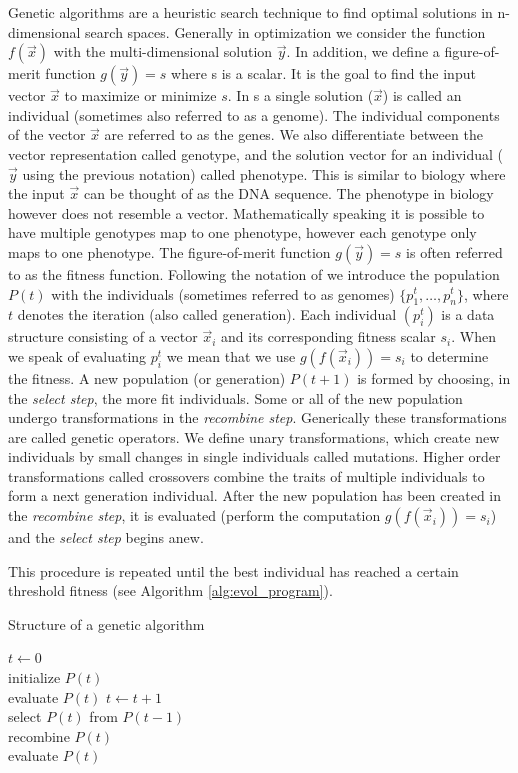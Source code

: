 Genetic algorithms are a heuristic search technique to find optimal solutions in n-dimensional search spaces. Generally in optimization we consider the function $f(\vec{x})$ with the multi-dimensional solution $\vec{y}$. In addition, we define a figure-of-merit function $g(\vec{y})=s$ where s is a scalar. It is the goal to find the input vector $\vec{x}$  to maximize or minimize $s$. In \ga s a single solution ($\vec{x}$) is called an individual (sometimes also referred to as a genome). The individual components of the vector $\vec{x}$ are referred to as the genes. We also differentiate between the vector representation called genotype, and the solution vector for an individual ($\vec{y}$ using the previous notation) called phenotype. This is similar to biology where the input $\vec{x}$ can be thought of as the DNA sequence. The phenotype in biology however does not resemble a vector.  Mathematically speaking it is possible to have multiple genotypes map to one phenotype, however each genotype only maps to one phenotype. The figure-of-merit function $g(\vec{y})=s$ is often referred to as the fitness function. 
Following the notation of \citep{Michalewicz:1994:GAD:184675} we introduce the population $P(t)$ with the individuals (sometimes referred to as genomes) $\{p_{1}^{t}, \dots, p_{n}^{t}\}$, where $t$ denotes the iteration (also called generation). Each individual $(p_{i}^t)$ is a data structure consisting of a vector $\vec{x}_i$ and its corresponding fitness scalar $s_i$.  When we speak of evaluating $p_{i}^{t}$ we mean that we use $g(f(\vec{x}_i))=s_i$ to determine the fitness. A new population (or generation) $P(t+1)$ is formed by choosing,  in the \textit{select step}, the more fit individuals. Some or all of the new population undergo transformations in the \textit{recombine step}. Generically these transformations are called genetic operators. We define unary transformations, which create new individuals by small changes in single individuals called mutations. Higher order transformations called crossovers combine the traits of multiple individuals to form a next generation individual. 
After the new population has been created in the \textit{recombine step}, it is evaluated (perform the computation $g(f(\vec{x}_i))=s_i$) and the \textit{select step} begins anew. 

This procedure is repeated until the best individual has reached a certain threshold fitness (see Algorithm \ref{alg:evol_program}). 



\begin{algorithm}
\label{alg:evol_program}
\caption{Structure of a genetic algorithm}
\begin{algorithmic}
\STATE $t \gets 0$\\
initialize $P(t)$\\
evaluate $P(t)$
\STATE $t \gets t+1$\\
select $P(t)$ from $P(t-1)$\\
recombine $P(t)$\\
evaluate $P(t)$
\ENDWHILE
\end{algorithmic}
\end{algorithm}

